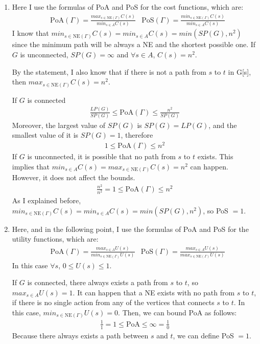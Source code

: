 \documentclass[a4paper, 11pt]{article}
\begin{document}
\begin{enumerate}[label=(\alph*)]
    \item Here I use the formulas of PoA and PoS for the cost functions, which are:
        \begin{align}
            &\text{PoA}(\Gamma) = \frac{max_{s \in \text{NE}(\Gamma)} C(s)}{min_{s \in A} C(s)} & \text{PoS}(\Gamma) = \frac{min_{s \in \text{NE}(\Gamma)} C(s)}{min_{s \in A} C(s)}
        \end{align}
        I know that $min_{s \in \text{NE}(\Gamma)} C(s) = min_{s \in A} C(s) = min(SP(G), n^2)$ since the minimum path will be always a NE and the shortest possible one. If $G$ is unconnected, $SP(G) = \infty$ and $\forall s \in A$, $C(s) = n^2$.

        By the statement, I also know that if there is not a path from $s$ to $t$ in G[s], then  $max_{s \in \text{NE}(\Gamma)} C(s) = n^2$.

        If $G$ is connected
        \begin{align}
            \frac{LP(G)}{SP(G)} \leq \text{PoA}(\Gamma) \leq \frac{n^2}{SP(G)}
        \end{align}
        Moreover, the largest value of $SP(G)$ is $SP(G) = LP(G)$, and the smallest value of it is $SP(G) = 1$, therefore
        \begin{align}
            1 \leq \text{PoA}(\Gamma) \leq n^2
        \end{align}
        If $G$ is unconnected, it is possible that no path from $s$ to $t$ exists. This implies that $min_{s \in A} C(s) = max_{s \in \text{NE}(\Gamma)} C(s) = n^2$ can happen. However, it does not affect the bounds.
        \begin{align}
            \frac{n^2}{n^2} = 1 \leq \text{PoA}(\Gamma) \leq n^2
        \end{align}
        As I explained before, $min_{s \in \text{NE}(\Gamma)} C(s) = min_{s \in A} C(s) = min(SP(G), n^2)$, so PoS $= 1$.
    \item Here, and in the following point, I use the formulas of PoA and PoS for the utility functions, which are:
        \begin{align}
            &\text{PoA}(\Gamma) = \frac{max_{s \in A} U(s)}{min_{s \in \text{NE}(\Gamma)} U(s)} & \text{PoS}(\Gamma) = \frac{max_{s \in A} U(s)}{max_{s \in \text{NE}(\Gamma)} U(s)}
        \end{align}
        In this case $\forall s$, $0 \leq U(s) \leq 1$.

        If $G$ is connected, there always exists a path from $s$ to $t$, so $max_{s \in A} U(s) = 1$. It can happen that a NE exists with no path from $s$ to $t$, if there is no single action from any of the vertices that connects $s$ to $t$. In this case, $min_{s \in \text{NE}(\Gamma)} U(s) = 0$. Then, we can bound PoA as follows:
        \begin{align}
            \frac{1}{1} = 1 \leq \text{PoA} \leq \infty = \frac{1}{0}
        \end{align}
        Because there always exists a path between $s$ and $t$, we can define PoS $= 1$.


\end{enumerate}
\end{document}
